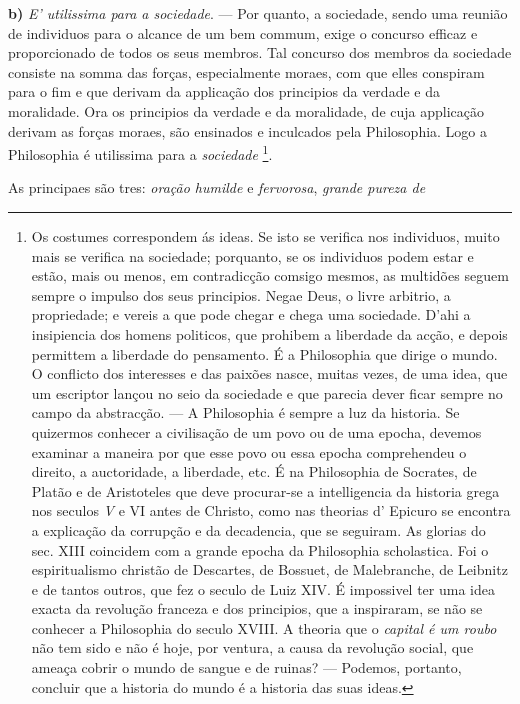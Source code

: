 \textbf{b)} \emph{E' utilissima para a sociedade}. --- Por quanto, a sociedade, sendo uma reunião de individuos para o alcance de um bem commum, exige o concurso efficaz e proporcionado de todos os seus membros. Tal concurso dos membros da sociedade consiste na somma das forças, especialmente moraes, com que elles conspiram para o fim e que derivam da applicação dos principios da verdade e da moralidade. Ora os principios da verdade e da moralidade, de cuja applicação derivam as forças moraes, são ensinados e inculcados pela Philosophia. Logo a Philosophia é utilissima para a \emph{sociedade} \footnote{Os costumes correspondem ás ideas. Se isto se verifica nos individuos, muito mais se verifica na sociedade; porquanto, se os individuos podem estar e estão, mais ou menos, em contradicção comsigo mesmos, as multidões seguem sempre o impulso dos seus principios. Negae Deus, o livre arbitrio, a propriedade; e vereis a que pode chegar e chega uma sociedade. D'ahi a insipiencia dos homens politicos, que prohibem a liberdade da acção, e depois permittem a liberdade do pensamento. É a Philosophia que dirige o mundo. O conflicto dos interesses e das paixões nasce, muitas vezes, de uma idea, que um escriptor lançou no seio da sociedade e que parecia dever ficar sempre no campo da abstracção. --- A Philosophia é sempre a luz da historia. Se quizermos conhecer a civilisação de um povo ou de uma epocha, devemos examinar a maneira por que esse povo ou essa epocha comprehendeu o direito, a auctoridade, a liberdade, etc. É na Philosophia de Socrates, de Platão e de Aristoteles que deve procurar-se a intelligencia da historia grega nos seculos \emph{V} e VI antes de Christo, como nas theorias d' Epicuro se encontra a explicação da corrupção e da decadencia, que se seguiram. As glorias do sec. XIII coincidem com a grande epocha da Philosophia scholastica. Foi o espiritualismo christão de Descartes, de Bossuet, de Malebranche, de Leibnitz e de tantos outros, que fez o seculo de Luiz XIV. É impossivel ter uma idea exacta da revolução franceza e dos principios, que a inspiraram, se não se conhecer a Philosophia do seculo XVIII. A theoria que o \emph{capital é um roubo} não tem sido e não é hoje, por ventura, a causa da revolução social, que ameaça cobrir o mundo de sangue e de ruinas? --- Podemos, portanto, concluir que a historia do mundo é a historia das suas ideas.}.


 
As principaes são tres: \emph{oração humilde} e \emph{fervorosa}, \emph{grande pureza de}

